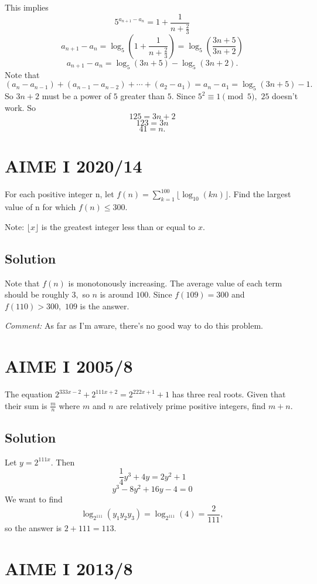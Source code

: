 \documentclass{article}
\begin{document}
This implies
    \[5^{a_{n+1}-a_n}=1+\frac{1}{n+\frac{2}{3}}\]
    \[a_{n+1}-a_n=\log_5(1+\frac{1}{n+\frac{2}{3}})=\log_5(\frac{3n+5}{3n+2})\]
    \[a_{n+1}-a_n=\log_5(3n+5)-\log_5(3n+2).\]
    Note that $(a_{n}-a_{n-1})+(a_{n-1}-a_{n-2})+\cdots+(a_{2}-a_{1})=a_n-a_1=\log_5(3n+5)-1.$ So $3n+2$ must be a power of $5$ greater than $5.$ Since $5^2\equiv 1\pmod{5},$ $25$ doesn't work. So
    \[125=3n+2\]
    \[123=3n\]
    \[41=n.\]

\pagebreak\section{AIME I 2020/14}

For each positive integer n, let $f(n) = \sum_{k = 1}^{100} \lfloor \log_{10} (kn) \rfloor$. Find the largest value of n for which $f(n) \le 300$.

Note: $\lfloor x \rfloor$ is the greatest integer less than or equal to $x$.

\subsection{Solution}

Note that $f(n)$ is monotonously increasing. The average value of each term should be roughly $3,$ so $n$ is around $100.$ Since $f(109)=300$ and $f(110)>300,$ $109$ is the answer.

\textit{Comment:} As far as I'm aware, there's no good way to do this problem.

\pagebreak\section{AIME I 2005/8}

The equation $2^{333x-2} + 2^{111x+2} = 2^{222x+1} + 1$ has three real roots. Given that their sum is $\frac mn$ where $m$ and $n$ are relatively prime positive integers, find $m+n.$

\subsection{Solution}

Let $y=2^{111x}.$ Then
    \[\frac{1}{4}y^3+4y=2y^2+1\]
    \[y^3-8y^2+16y-4=0\]
    We want to find
    \[\log_{2^{111}}({y_1y_2y_3})=\log_{2^{111}}({4})=\frac{2}{111},\]
    so the answer is $2+111=113.$

\pagebreak\section{AIME I 2013/8}
\end{document}
